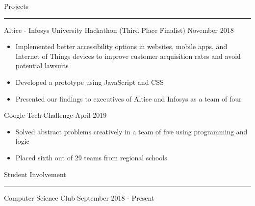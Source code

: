 \documentclass{article}
\newcommand \spacingBetweenHeadings {0.4em}
\begin{document}
\noindent
\huge Projects\par
\vspace{0.1em}
\hrule
\Large
\vspace{1em}
\noindent
Altice - Infosys University Hackathon (Third Place Finalist)
\hfill
November 2018\\
\vspace{-1em}
\begin{itemize}
\item Implemented better accessibility options in websites, mobile apps, and Internet of Things devices to improve customer acquisition rates and avoid potential lawsuits
\item Developed a prototype using JavaScript and CSS
\item Presented our findings to executives of Altice and Infosys as a team of four
\end{itemize}
Google Tech Challenge
\hfill
April 2019\\
\vspace{-1em}
\begin{itemize}
\item Solved abstract problems creatively in a team of five using programming and logic
\item Placed sixth out of 29 teams from regional schools
\end{itemize}
\vspace{\spacingBetweenHeadings}

\noindent
\huge Student Involvement\par
\vspace{0.1em}
\hrule
\Large
\vspace{1em}
\noindent
Computer Science Club
\hfill
September 2018 - Present\\
\end{document}
